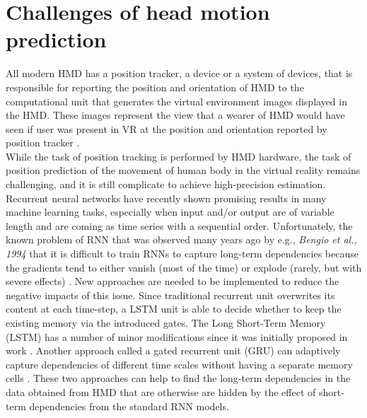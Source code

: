 \section{Challenges of head motion prediction}
\label{sec:theorie:head_pred}
All modern HMD has a position tracker, a device or a system of devices, that is responsible for reporting  the position and orientation of HMD to the computational unit that generates the virtual environment images displayed in the HMD. These images represent the view that a wearer of HMD would have seen if user was present in VR at the position and orientation reported by position tracker \cite{hmd}.\\
While the task of position tracking is performed by HMD hardware, the task of position prediction of the movement of human body in the virtual reality remains challenging, and it is still complicate to achieve high-precision estimation. Recurrent neural networks have recently shown promising results in many machine learning tasks, especially when input and/or output are of variable length and are coming as time series with a sequential order.  Unfortunately, the known problem of RNN that was observed many years ago by e.g., \textit{Bengio et al., 1994} that it is difficult to train RNNs to capture long-term dependencies because the gradients tend to either vanish (most of the time) or explode (rarely, but with severe effects) \cite{rnn_difficults}. New approaches are needed to be implemented to reduce the negative impacts of this issue. Since traditional recurrent unit overwrites its content at each time-step, a LSTM unit is able to decide whether to keep the existing memory via the introduced gates. The Long Short-Term Memory (LSTM) has a number of minor modifications \cite{empirical_evaluation} since it was initially proposed in work \cite{lstm_orig}. Another approach called a gated recurrent unit (GRU) can adaptively capture dependencies of different time scales without having a separate memory cells \cite{empirical_evaluation}. These two approaches can help to find the long-term dependencies in the data obtained from HMD that are otherwise are hidden by the effect of short-term dependencies from the standard RNN models.\\
